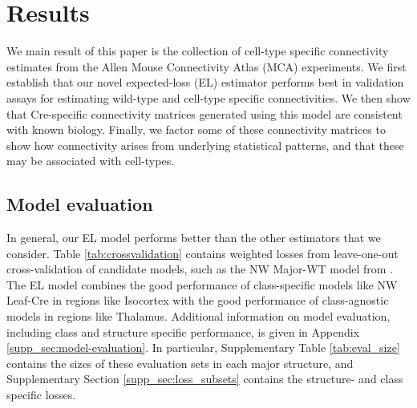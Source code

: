 \section{Results}
\label{sec:results}

We main result of this paper is the collection of cell-type specific connectivity estimates from the Allen Mouse Connectivity Atlas (MCA) experiments.
We first establish that our novel expected-loss (EL) estimator performs best in validation assays for estimating wild-type and cell-type specific connectivities.
We then show that Cre-specific connectivity matrices generated using this model are consistent with known biology. 
Finally, we factor some of these connectivity matrices to show how connectivity arises from underlying statistical patterns, and that these may be associated with cell-types.

\subsection{Model evaluation}
\label{sec:model_eval}

In general, our EL model performs better than the other estimators that we consider.
Table \ref{tab:crossvalidation} contains weighted losses from leave-one-out cross-validation of candidate models, such as the NW Major-WT model from \citet{Knox2019-ot}.
The EL model combines the good performance of class-specific models like NW Leaf-Cre in regions like Isocortex with the good performance of class-agnostic models in regions like Thalamus.
Additional information on model evaluation, including class and structure specific performance, is given in Appendix \ref{supp_sec:model-evaluation}.
In particular, Supplementary Table \ref{tab:eval_size} contains the sizes of these evaluation sets in each major structure, and Supplementary Section \ref{supp_sec:loss_subsets} contains the structure- and class specific losses.

